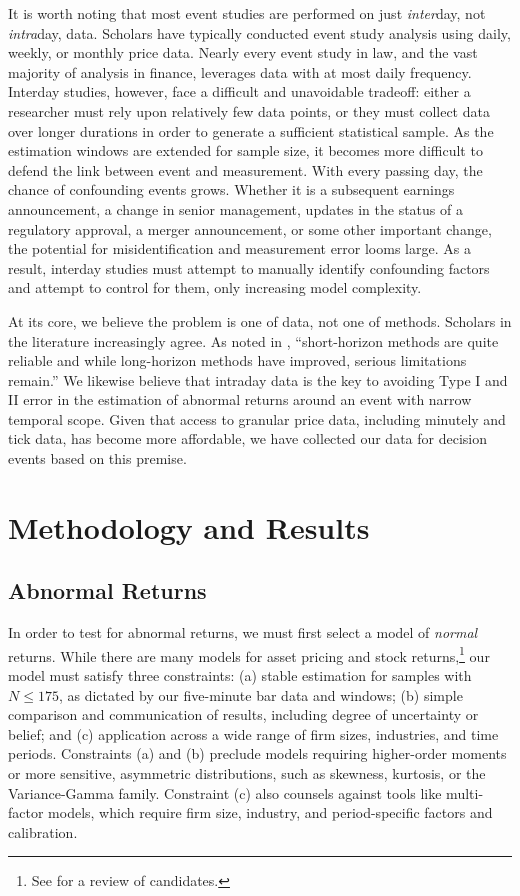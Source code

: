 \documentclass[preprint,12pt]{elsarticle}
\begin{document}
It is worth noting that most event studies are performed on just \textit{inter}day, not \textit{intra}day, data.  Scholars have typically conducted event study analysis using daily, weekly, or monthly price data. Nearly every event study in law, and the vast majority of analysis in finance, leverages data with at most daily frequency.  Interday studies, however, face a difficult and unavoidable tradeoff: either a researcher must rely upon relatively few data points, or they must collect data over longer durations in order to generate a sufficient statistical sample. As the estimation windows are extended for sample size, it becomes more difficult to defend the link between event and measurement.  With every passing day, the chance of confounding events grows.  Whether it is a subsequent earnings announcement, a change in senior management, updates in the status of a regulatory approval, a merger announcement, or some other important change, the potential for misidentification and measurement error looms large.  As a result, interday studies must attempt to manually identify confounding factors and attempt to control for them, only increasing model complexity.

At its core, we believe the problem is one of data, not one of methods. Scholars in the literature increasingly agree.  As noted in \cite{kothari2007econometrics}, ``short-horizon methods are quite reliable and while long-horizon methods have improved, serious limitations remain.'' We likewise believe that intraday data is the key to avoiding Type I and II error in the estimation of abnormal returns around an event with narrow temporal scope.  Given that access to granular price data, including minutely and tick data, has become more affordable, we have collected our data for decision events based on this premise.

\section{Methodology and Results}
\label{S:4}
\subsection{Abnormal Returns}
In order to test for abnormal returns, we must first select a model of \textit{normal} returns.  While there are many models for asset pricing and stock returns,\footnote{See \cite{nadarajah2012models} for a review of candidates.}  our model must satisfy three constraints: (a) stable estimation for samples with $N \leq 175$, as dictated by our five-minute bar data and windows; (b) simple comparison and communication of results, including degree of uncertainty or belief; and (c) application across a wide range of firm sizes, industries, and time periods.  Constraints (a) and (b) preclude models requiring higher-order moments or more sensitive, asymmetric distributions, such as skewness, kurtosis, or the Variance-Gamma family.  Constraint (c) also counsels against tools like multi-factor models, which require firm size, industry, and period-specific factors and calibration.
\end{document}
